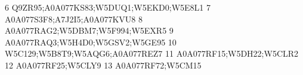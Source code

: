 \documentclass{beamer}
\begin{document}
\begin{frame}[fragile]
\begin{itemize}
\begin{Schunk}
\begin{Soutput}
6                                                                                                                                                                                                                                                                                                                                          Q9ZR95;A0A077KS83;W5DUQ1;W5EKD0;W5E8L1
7                                                                                                                                                                                                                                                                                                                                                    A0A077S3F8;A7J2I5;A0A077KVU8
8                                                                                                                                                                                                                                                                                                                                                 A0A077RAG2;W5DBM7;W5F994;W5EXR5
9                                                                                                                                                                                                                                                                                                                                                 A0A077RAQ3;W5H4D0;W5GSV2;W5GE95
10                                                                                                                                                                                                                                                                                                                                                W5C129;W5B8T9;W5AQG6;A0A077REZ7
11                                                                                                                                                                                                                                                                                                                                                       A0A077RF15;W5DH22;W5CLR2
12                                                                                                                                                                                                                                                                                                                                                              A0A077RF25;W5CLY9
13                                                                                                                                                                                                                                                                                                                                                              A0A077RF72;W5CM15

\end{Soutput}
\end{Schunk}
\end{itemize}
\end{frame}
\end{document}

